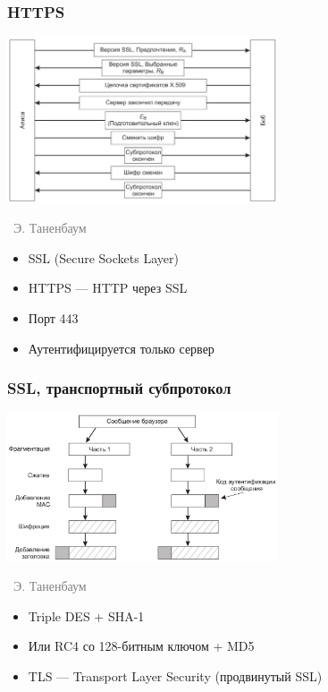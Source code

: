 \documentclass[xetex,mathserif,serif]{beamer}
\newcommand{\attribution}[1] {
\vspace{-5mm}\begin{flushright}\begin{scriptsize}\textcolor{gray}{\textcopyright\, #1}\end{scriptsize}\end{flushright}
}
\begin{document}
	\begin{frame}
		\frametitle{HTTPS}
		\begin{center}
			\includegraphics[width=0.6\textwidth]{ssl.png}
			\attribution{Э. Таненбаум}
		\end{center}
		\begin{itemize}
			\item SSL (Secure Sockets Layer)
			\item HTTPS --- HTTP через SSL
			\item Порт 443
			\item Аутентифицируется только сервер
		\end{itemize}
	\end{frame}

	\begin{frame}
		\frametitle{SSL, транспортный субпротокол}
		\begin{center}
			\includegraphics[width=0.6\textwidth]{sslCommunication.png}
			\attribution{Э. Таненбаум}
		\end{center}
		\begin{itemize}
			\item Triple DES + SHA-1
			\item Или RC4 со 128-битным ключом + MD5
			\item TLS --- Transport Layer Security (продвинутый SSL)
		\end{itemize}
	\end{frame}
\end{document}
